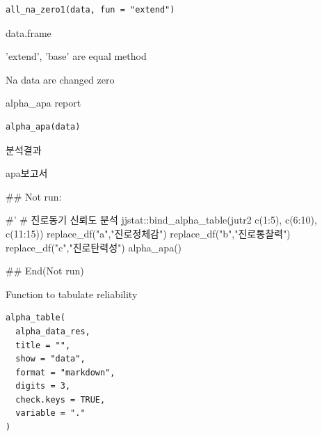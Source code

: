 \documentclass[a4paper]{book}
\begin{document}
%
\begin{Usage}
\begin{verbatim}
all_na_zero1(data, fun = "extend")
\end{verbatim}
\end{Usage}
%
\begin{Arguments}
\begin{ldescription}
\item[\code{data}] data.frame

\item[\code{fun}] 'extend', 'base' are equal method
\end{ldescription}
\end{Arguments}
%
\begin{Value}
Na data are changed zero
\end{Value}
%
\begin{Description}
alpha\_apa report
\end{Description}
%
\begin{Usage}
\begin{verbatim}
alpha_apa(data)
\end{verbatim}
\end{Usage}
%
\begin{Arguments}
\begin{ldescription}
\item[\code{data}] 분석결과
\end{ldescription}
\end{Arguments}
%
\begin{Value}
apa보고서
\end{Value}
%
\begin{Examples}
\begin{ExampleCode}
## Not run: 

#'
# 진로동기 신뢰도 분석
jjstat::bind_alpha_table(jutr2%
                         c(1:5), c(6:10), c(11:15)) %
  replace_df("a","진로정체감") %
  replace_df("b","진로통찰력") %
  replace_df("c","진로탄력성") %
  alpha_apa()


## End(Not run)
\end{ExampleCode}
\end{Examples}
%
\begin{Description}
Function to tabulate reliability
\end{Description}
%
\begin{Usage}
\begin{verbatim}
alpha_table(
  alpha_data_res,
  title = "",
  show = "data",
  format = "markdown",
  digits = 3,
  check.keys = TRUE,
  variable = "."
)
\end{verbatim}
\end{Usage}
\end{document}
